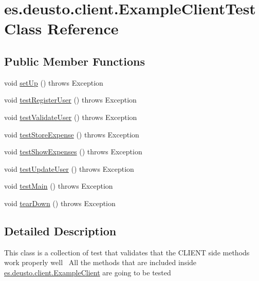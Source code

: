 \hypertarget{classes_1_1deusto_1_1client_1_1_example_client_test}{}\section{es.\+deusto.\+client.\+Example\+Client\+Test Class Reference}
\label{classes_1_1deusto_1_1client_1_1_example_client_test}
\subsection*{Public Member Functions}
\begin{DoxyCompactItemize}
\item 
void \hyperlink{classes_1_1deusto_1_1client_1_1_example_client_test_a61fde1da201769cbe17f77b8772eeeb7}{set\+Up} ()  throws Exception 
\item 
void \hyperlink{classes_1_1deusto_1_1client_1_1_example_client_test_a59d9c8bd0d8d85e0b0ded16ef0f9cb85}{test\+Register\+User} ()  throws Exception 
\item 
void \hyperlink{classes_1_1deusto_1_1client_1_1_example_client_test_a811ff9955188b9cc3cbb4120f7bad542}{test\+Validate\+User} ()  throws Exception 
\item 
void \hyperlink{classes_1_1deusto_1_1client_1_1_example_client_test_ad8b31f30dcc49c24a0473d59f0c8d9ef}{test\+Store\+Expense} ()  throws Exception 
\item 
void \hyperlink{classes_1_1deusto_1_1client_1_1_example_client_test_adedccf184289eaf6d6cc3f53a2fdc621}{test\+Show\+Expenses} ()  throws Exception 
\item 
void \hyperlink{classes_1_1deusto_1_1client_1_1_example_client_test_a56744195ae10c2d3e4763fcf4511aae7}{test\+Update\+User} ()  throws Exception 
\item 
void \hyperlink{classes_1_1deusto_1_1client_1_1_example_client_test_a6d89c8424397bc3fef01913b98fb79ef}{test\+Main} ()  throws Exception 
\item 
void \hyperlink{classes_1_1deusto_1_1client_1_1_example_client_test_ab3c56961d74c443c19c172674e7503e1}{tear\+Down} ()  throws Exception 
\end{DoxyCompactItemize}


\subsection{Detailed Description}
This class is a collection of test that validates that the C\+L\+I\+E\+NT side methods work properly well~\newline
All the methods that are included inside \hyperlink{classes_1_1deusto_1_1client_1_1_example_client}{es.\+deusto.\+client.\+Example\+Client} are going to be tested 

